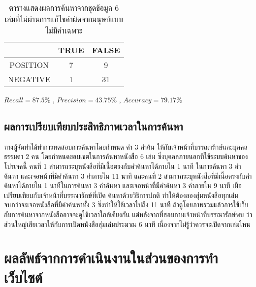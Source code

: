 \begin{table}[H]
    \caption{ตารางแสดงผลการค้นหาจากชุดข้อมูล 6 เล่มที่ไม่ผ่านการแก้ไขคำผิดจากมนุษย์แบบไม่มีคำเฉพาะ}\label{tbl:evasearchnoname2}
    \begin{tabular}{|c|c|c|}
    \hline
                & TRUE & FALSE \\ \hline
    POSITION & 7   & 9   \\ \hline
    NEGATIVE & 1   & 31   \\ \hline
    \end{tabular}
    \end{table}
    $Recall = 87.5 \%$ , $Precision = 43.75 \%$ , $Accuracy = 79.17 \%$



\subsection{ผลการเปรียบเทียบประสิทธิภาพเวลาในการค้นหา}
ทางผู้จัดทำได้ทำการทดสอบการค้นหาโดยกำหนด คำ 3 คำค้น ให้กับเจ้าหน้าที่บรรณารักษ์และบุคคลธรรมดา 
2 คน โดยกำหนดขอบเขตในการค้นหาหนังสือ 6 เล่ม ซึ่งบุคคลภายนอกที่ใช้ระบบค้นหาของโปรเจคนี้ คนที่ 1 
สามารถระบุหนังสือที่มีเนื้อตรงกับคำค้นหาได้ภายใน 1 นาที ในการค้นหา 3 คำค้นหา และเจอหน้าที่มีคำค้นหา 
3 คำภายใน 11 นาที และคนที่ 2 สามารถระบุหนังสือที่มีเนื้อตรงกับคำค้นหาได้ภายใน 1 นาทีในการค้นหา 3 
คำค้นหา และเจอหน้าที่มีคำค้นหา 3 คำภายใน 9 นาที เมื่อเปรียบเทียบกับเจ้าหน้าที่บรรณารักษ์ที่เปิด
ค้นหาด้วยวิธีการปกติ ทำให้ต้องลองสุ่มหนังสือทุกเล่มจนกว่าจะเจอหนังสือที่มีคำค้นหาทั้ง 3 ซึ่งทำให้ใช้เวลาไปถึง 11 นาที
ถ้าดูโดยภาพรวมแล้วการใช้เว็บกับการค้นหาจากหนังสืออาจจะดูใช้เวลาใกล้เคียงกัน แต่หลังจากที่สอบถามเจ้าหน้าที่บรรณารักษ์พบ
ว่าส่วนใหญ่เสียเวลาให้กับการเปิดหนังสือสุ่มเล่มประมาณ 6 นาที เนื่องจากไม่รู้ว่าควรจะเปิดจากเล่มไหน
 

\section{ผลลัพธ์จากการดำเนินงานในส่วนของการทำเว็บไซต์}
